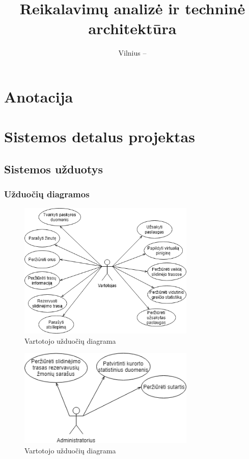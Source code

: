 \documentclass[oneside]{VUMIFPSkursinis}
\title{Reikalavimų analizė ir techninė architektūra}
\date{Vilnius – \the\year}
\begin{document}
\maketitle
\tableofcontents

\section{Anotacija}

\section{Sistemos detalus projektas}
	\subsection{Sistemos užduotys}
		\subsubsection{Užduočių diagramos}

\pagebreak

			\begin{figure}[h]
    				\centering
    				\includegraphics[width=0.75\textwidth]{useCaseVartotojas.png}
    				\caption{Vartotojo užduočių diagrama}
    				\label{fig:VartotojoUseCasel}
			\end{figure}

			\begin{figure}[h]
    				\centering
    				\includegraphics[width=0.75\textwidth]{useCaseAdministratorius.png}
    				\caption{Vartotojo užduočių diagrama}
    				\label{fig:VartotojoUseCasel}
			\end{figure}
\pagebreak
\end{document}

